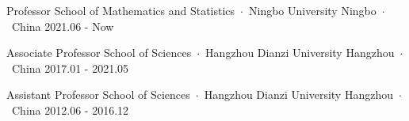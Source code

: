 %
%
%
%


\begin{cventries}
	
	\cventry
	{Professor} %
	{School of Mathematics and Statistics~$\cdot$~Ningbo University} %
	{Ningbo~$\cdot$~China} %
	{2021.06 - Now} %
	{}
	
	\cventry
	{Associate Professor} %
	{School of Sciences~$\cdot$~Hangzhou Dianzi University} %
	{Hangzhou~$\cdot$~China} %
	{2017.01 - 2021.05} %
	{}
	
	\cventry
	{Assistant Professor} %
    {School of Sciences~$\cdot$~Hangzhou Dianzi University} %
	{Hangzhou~$\cdot$~China} %
	{2012.06 - 2016.12} %
	{}
	
	
	
\end{cventries}